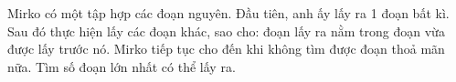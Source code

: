Mirko có một tập hợp các đoạn nguyên. Đầu tiên, anh ấy lấy ra 1 đoạn bất kì. Sau đó thực hiện lấy các đoạn khác, sao cho: đoạn lấy ra nằm trong đoạn vừa được lấy trước nó. Mirko tiếp tục cho đến khi không tìm được đoạn thoả mãn nữa.
Tìm số đoạn lớn nhất có thể lấy ra.